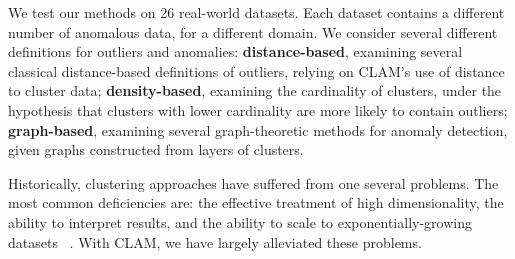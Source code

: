 We test our methods on 26 real-world datasets. 
Each dataset contains a different number of anomalous data, for a different domain.
We consider several different definitions for outliers and anomalies: \textbf{distance-based}, examining several classical distance-based definitions of outliers, relying on CLAM's use of distance to cluster data; \textbf{density-based}, examining the cardinality of clusters, under the hypothesis that clusters with lower cardinality are more likely to contain outliers; \textbf{graph-based}, examining several graph-theoretic methods for anomaly detection, given graphs constructed from layers of clusters.

Historically, clustering approaches have suffered from one several problems.
The most common deficiencies are: the effective treatment of high dimensionality, the ability to interpret results, and the ability to scale to exponentially-growing datasets ~\cite{rakesh_agrawal_automatic_1998}.
With CLAM, we have largely alleviated these problems.
